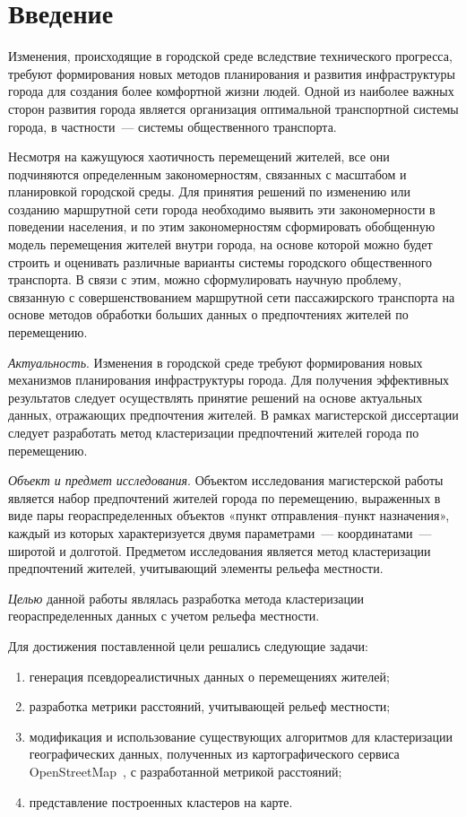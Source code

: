 \part{Введение}

Изменения, происходящие в городской среде вследствие технического прогресса, требуют формирования новых методов планирования и развития инфраструктуры города для создания более комфортной жизни людей. Одной из наиболее важных сторон развития города является организация оптимальной транспортной системы города, в частности~--- системы общественного транспорта.

Несмотря на кажущуюся хаотичность перемещений жителей, все они подчиняются определенным закономерностям, связанных с масштабом и планировкой городской среды. Для принятия решений по изменению или созданию маршрутной сети города необходимо выявить эти закономерности в поведении населения, и по этим закономерностям сформировать обобщенную модель перемещения жителей внутри города, на основе которой можно будет строить и оценивать различные варианты системы городского общественного транспорта. В связи с этим, можно сформулировать научную проблему, связанную с совершенствованием маршрутной сети пассажирского транспорта на основе методов обработки больших данных о предпочтениях жителей по перемещению.

\emph{Актуальность}. Изменения в городской среде требуют формирования новых механизмов планирования инфраструктуры города. Для получения эффективных результатов следует осуществлять принятие решений на основе актуальных данных, отражающих предпочтения жителей. В рамках магистерской диссертации следует разработать метод кластеризации предпочтений жителей города по перемещению.

\emph{Объект и предмет исследования}. Объектом исследования магистерской работы является набор предпочтений жителей города по перемещению, выраженных в виде пары геораспределенных объектов «пункт отправления--пункт назначения», каждый из которых характеризуется двумя параметрами~--- координатами~--- широтой и долготой. Предметом исследования является метод кластеризации предпочтений жителей, учитывающий элементы рельефа местности.

\emph{Целью} данной работы являлась разработка метода кластеризации геораспределенных данных с учетом рельефа местности.

Для достижения поставленной цели решались следующие задачи:
\begin{enumerate}
    \item генерация псевдореалистичных данных о перемещениях жителей;
    \item разработка метрики расстояний, учитывающей рельеф местности;
    \item модификация и использование существующих алгоритмов для кластеризации географических данных, полученных из картографического сервиса OpenStreetMap~\cite{OSM}, с разработанной метрикой расстояний;
    \item представление построенных кластеров на карте.
\end{enumerate}

